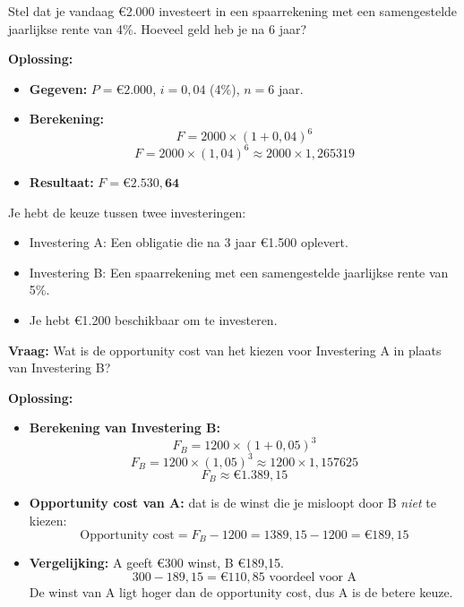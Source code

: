 \documentclass[a4paper,11pt]{article}
\begin{document}
\begin{oefenblok}
    Stel dat je vandaag €2.000 investeert in een spaarrekening met een samengestelde jaarlijkse rente van 4\%. Hoeveel geld heb je na 6 jaar?

    \textbf{Oplossing:}
    \begin{itemize}
        \item \textbf{Gegeven:} $P = €2.000$, $i = 0,04$ (4\%), $n = 6$ jaar.
        \item \textbf{Berekening:}
              \[ F = 2000 \times (1 + 0,04)^6 \]
              \[ F = 2000 \times (1,04)^6 \approx 2000 \times 1,265319 \]
        \item \textbf{Resultaat:} $F = \mathbf{€2.530,64}$
    \end{itemize}
\end{oefenblok}

\begin{oefenblok}
    Je hebt de keuze tussen twee investeringen:
    \begin{itemize}
        \item Investering A: Een obligatie die na 3 jaar €1.500 oplevert.
        \item Investering B: Een spaarrekening met een samengestelde jaarlijkse rente van 5\%.
        \item Je hebt €1.200 beschikbaar om te investeren.
    \end{itemize}

    \textbf{Vraag:} Wat is de opportunity cost van het kiezen voor Investering A in plaats van Investering B?

    \textbf{Oplossing:}
    \begin{itemize}
        \item \textbf{Berekening van Investering B:}
              \[ F_B = 1200 \times (1 + 0,05)^3 \]
              \[ F_B = 1200 \times (1,05)^3 \approx 1200 \times 1,157625 \]
              \[ F_B \approx €1.389,15 \]
        \item \textbf{Opportunity cost van A:} dat is de winst die je misloopt door B \emph{niet} te kiezen:
              \[ \text{Opportunity cost} = F_B - 1200 = 1389,15 - 1200 = €189,15 \]
        \item \textbf{Vergelijking:} A geeft €300 winst, B €189,15.
              \[ 300 - 189,15 = €110,85 \text{ voordeel voor A} \]
              De winst van A ligt hoger dan de opportunity cost, dus A is de betere keuze.
    \end{itemize}
\end{oefenblok}
\end{document}
